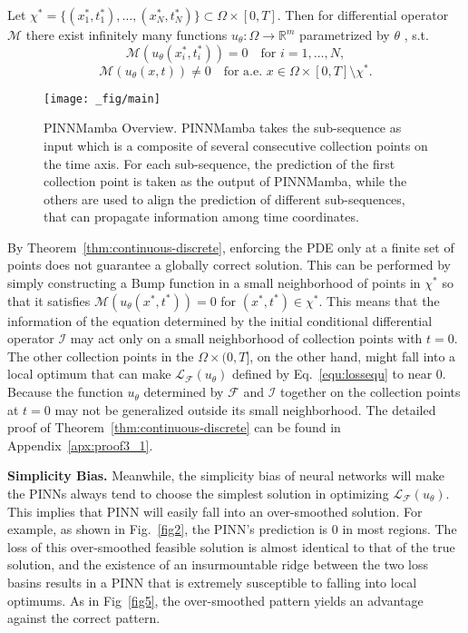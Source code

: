 \begin{theorem}\label{thm:continuous-discrete}
    Let $\chi^* = \{(x^*_1,t^*_1),\dots,(x^*_N,t^*_N)\}\subset \Omega\times[0,T]$. Then for differential operator $\mathcal M$ there exist infinitely many functions
$u_\theta : \Omega \to \mathbb{R}^m$ parametrized by $\theta$ , s.t.
$$ \mathcal{M}(u_\theta(x^*_i,t^*_i)) = 0 \quad \text{for } i=1,\dots,N,$$ $$ 
   \mathcal{M}(u_\theta(x,t)) \neq 0
   \quad \text{for a.e. } x \in \Omega\times[0,T] \setminus \chi^*.$$
\end{theorem}

\begin{figure*}[t!]
    \centering
    \texttt{[image: \_fig/main]}
    \vspace{-6mm}
    \caption{PINNMamba Overview. PINNMamba takes the sub-sequence as input which is a composite of several consecutive collection points on the time axis. For each sub-sequence, the prediction of the first collection point is taken as the output of PINNMamba, while the others are used to align the prediction of different sub-sequences, that can propagate information among time coordinates.}
    \label{fig:main}
    \vspace{-4mm}
\end{figure*}

 By Theorem~\ref{thm:continuous-discrete}, enforcing the PDE only at a finite set of points does not guarantee a globally correct solution. This can be performed by simply constructing a Bump function in a small neighborhood of points in $\chi^*$ so that it satisfies $\mathcal{M}(u_\theta(x^*,t^*)) = 0$ for $(x^*,t^*) \in \chi^*$. This means that the information of the equation determined by the initial conditional differential operator $\mathcal I$ may act only on a small neighborhood of collection points with $t = 0$. The other collection points in the $\Omega\times(0,T]$, on the other hand, might fall into a local optimum that can make $\mathcal L_{\mathcal F}(u_\theta)$ defined by Eq.~\ref{equ:lossequ} to near 0. 
 Because the function $u_{\theta}$ determined by $\mathcal F$ and $\mathcal I$ together on the collection points at $t = 0$ may not be generalized outside its small neighborhood. The detailed proof
of Theorem~\ref{thm:continuous-discrete} can be found in Appendix~\ref{apx:proof3_1}.
 
\textbf{Simplicity Bias.} Meanwhile, the simplicity bias of neural networks will make the PINNs always tend to choose the simplest solution in optimizing $\mathcal L_{\mathcal F}(u_\theta)$. This implies that PINN will easily fall into an over-smoothed solution. For example, as shown in Fig.~\ref{fig2}, the PINN's prediction is 0 in most regions. The loss of this over-smoothed feasible solution is almost identical to that of the true solution, and the existence of an insurmountable ridge between the two loss basins results in a PINN that is extremely susceptible to falling into local optimums. As in Fig~\ref{fig5}, the over-smoothed pattern yields an advantage against the correct pattern.

